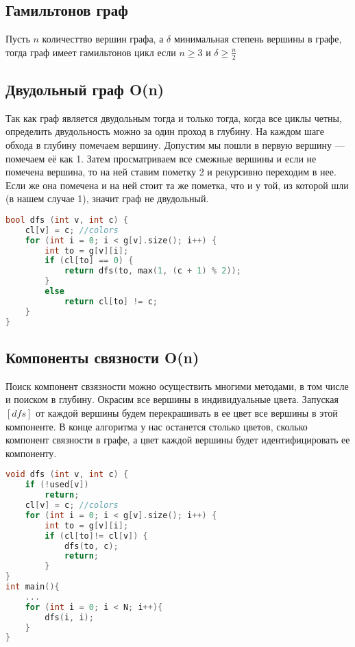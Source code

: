 \subsection{Гамильтонов граф}
Пусть ${n}$ количесттво вершин графа, а ${\delta}$ минимальная степень вершины в графе, тогда граф имеет гамильтонов цикл если ${n\geq 3}$ и ${\delta \geq \frac{n}{2}}$
\subsection{Двудольный граф O(n)}
Так как граф является двудольным тогда и только тогда, когда все циклы четны, определить двудольность можно за один проход в глубину. На каждом шаге обхода в глубину помечаем вершину. Допустим мы пошли в первую вершину — помечаем её как 1. Затем просматриваем все смежные вершины и если не помечена вершина, то на ней ставим пометку 2 и рекурсивно переходим в нее. Если же она помечена и на ней стоит та же пометка, что и у той, из которой шли (в нашем случае 1), значит граф не двудольный.
\begin{lstlisting}[language=C++]
bool dfs (int v, int c) {
	cl[v] = c; //colors
	for (int i = 0; i < g[v].size(); i++) {
		int to = g[v][i];
		if (cl[to] == 0) {
		    return dfs(to, max(1, (c + 1) % 2));
		}
		else 
		    return cl[to] != c;
	}
}
\end{lstlisting}
\subsection{Компоненты связности O(n)}
Поиск компонент свзязности можно осуществить многими методами, в том числе и поиском в глубину. Окрасим все вершины в индивидуальные цвета. Запуская $[dfs]$ от каждой вершины будем перекрашивать в ее цвет все вершины в этой компоненте. В конце алгоритма у нас останется столько цветов, сколько компонент связности в графе, а цвет каждой вершины будет идентифицировать ее компоненту.
\begin{lstlisting}[language=C++]
void dfs (int v, int c) {
    if (!used[v])
        return;
	cl[v] = c; //colors
	for (int i = 0; i < g[v].size(); i++) {
		int to = g[v][i];
		if (cl[to]!= cl[v]) {
		    dfs(to, c);
		    return;
		}
}
int main(){
    ...
    for (int i = 0; i < N; i++){
        dfs(i, i);
    }
}
\end{lstlisting}

